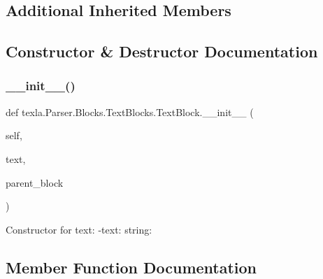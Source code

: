 \subsection*{Additional Inherited Members}


\subsection{Constructor \& Destructor Documentation}
\hypertarget{classtexla_1_1Parser_1_1Blocks_1_1TextBlocks_1_1TextBlock_afc1b469142bce14bab40d102d42203f0}{}\label{classtexla_1_1Parser_1_1Blocks_1_1TextBlocks_1_1TextBlock_afc1b469142bce14bab40d102d42203f0} 
\subsubsection{\texorpdfstring{\+\_\+\+\_\+init\+\_\+\+\_\+()}{\_\_init\_\_()}}
{\footnotesize\ttfamily def texla.\+Parser.\+Blocks.\+Text\+Blocks.\+Text\+Block.\+\_\+\+\_\+init\+\_\+\+\_\+ (\begin{DoxyParamCaption}\item[{}]{self,  }\item[{}]{text,  }\item[{}]{parent\+\_\+block }\end{DoxyParamCaption})}

\begin{DoxyVerb}Constructor for text:
-text: string:
\end{DoxyVerb}
 

\subsection{Member Function Documentation}
\hypertarget{classtexla_1_1Parser_1_1Blocks_1_1TextBlocks_1_1TextBlock_a9abef4d8bec9802fe085eeb1e236f2fb}{}\label{classtexla_1_1Parser_1_1Blocks_1_1TextBlocks_1_1TextBlock_a9abef4d8bec9802fe085eeb1e236f2fb} 
